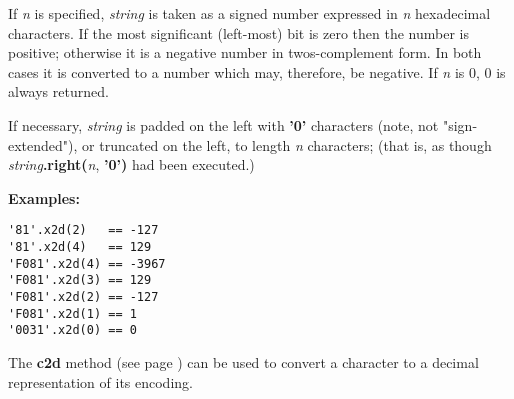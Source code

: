 \begin{description}
If \emph{n} is specified, \emph{string} is taken as a signed
number expressed in \emph{n} hexadecimal characters.
If the most significant (left-most) bit is zero then the number is
positive; otherwise it is a negative number in twos-complement form.
In both cases it is converted to a \nr{} number which may,
therefore, be negative.
If \emph{n} is 0, 0 is always returned.
 
If necessary, \emph{string} is padded on the left
with \textbf{'0'} characters (note, not "sign-extended"), or
truncated on the left, to length \emph{n} characters; (that is, as
though \emph{string}\textbf{.right(}\emph{n}, \textbf{'0')}
had been executed.)
 
\textbf{Examples:}
\begin{lstlisting}
'81'.x2d(2)   == -127
'81'.x2d(4)   == 129
'F081'.x2d(4) == -3967
'F081'.x2d(3) == 129
'F081'.x2d(2) == -127
'F081'.x2d(1) == 1
'0031'.x2d(0) == 0
\end{lstlisting}
 The  \textbf{c2d} method (see page \pageref{refc2d})  can be used to convert
a character to a decimal representation of its encoding.
\end{description}

